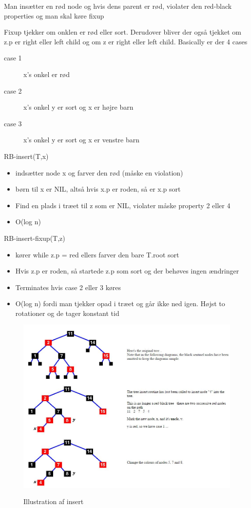 \documentclass[11pt,a4paper]{report}
\theoremstyle{plain}
\theoremstyle{definition}
\theoremstyle{remark}
\numberwithin{equation}{section}
\begin{document}
Man insætter en rød node og hvis dens parent er rød, violater den red-black properties og man skal køre fixup

Fixup tjekker om onklen er rød eller sort. Derudover bliver der også tjekket om z.p er right eller left child og om z er right eller left child. Basically er der 4 cases

\begin{description}
  \item[case 1] x's onkel er rød
  \item[case 2] x's onkel y er sort og x er højre barn
  \item[case 3] x's onkel y er sort og x er venstre barn
\end{description}

RB-insert(T,x)
\begin{itemize}
  \item indsætter node x og farver den rød (måske en violation)
  \item børn til x er NIL, altså hvis x.p er roden, så er x.p sort
  \item Find en plads i træet til z som er NIL, violater måske property 2 eller 4
  \item O(log n)
\end{itemize}

RB-insert-fixup(T,z)
\begin{itemize}
  \item kører while z.p = red ellers farver den bare T.root sort
  \item Hvis z.p er roden, så startede z.p som sort og der behøves ingen ændringer
  \item Terminates hvis case 2 eller 3 køres
  \item O(log n) fordi man tjekker opad i træet og går ikke ned igen. Højst to rotationer og de tager konstant tid
\end{itemize}

\begin{figure}[H]
  \centering
  \includegraphics[scale=0.5]{RBInsert1.jpg}\\
  \caption{Illustration af insert}
\end{figure}
\end{document}
